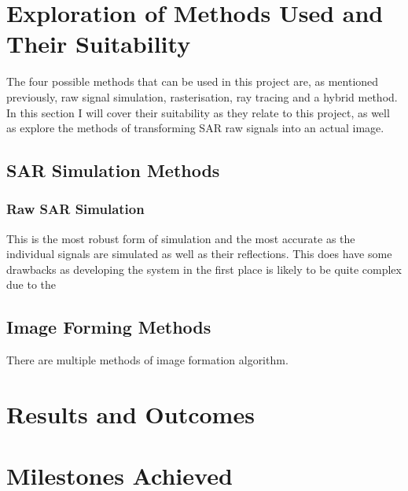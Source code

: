 \section{Exploration of Methods Used and Their Suitability}
\label{sec:method_exploration}
The four possible methods that can be used in this project are, as mentioned previously, raw signal simulation, rasterisation, ray tracing and a hybrid method. In this section I will cover their suitability as they relate to this project, as well as explore the methods of transforming SAR raw signals into an actual image.
\subsection{SAR Simulation Methods}
\subsubsection{Raw SAR Simulation}
This is the most robust form of simulation and the most accurate as the individual signals are simulated as well as their reflections. This does have some drawbacks as developing the system in the first place is likely to be quite complex due to the 
\subsection{Image Forming Methods}
There are multiple methods of image formation algorithm. 
\section{Results and Outcomes}
\section{Milestones Achieved}